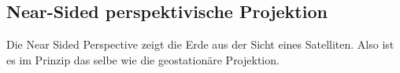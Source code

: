 \subsection{Near-Sided perspektivische Projektion}
\label{sec:nearsideperspective}
Die Near Sided Perspective zeigt die Erde aus der Sicht eines Satelliten. Also ist es im Prinzip das selbe
wie die geostationäre Projektion.